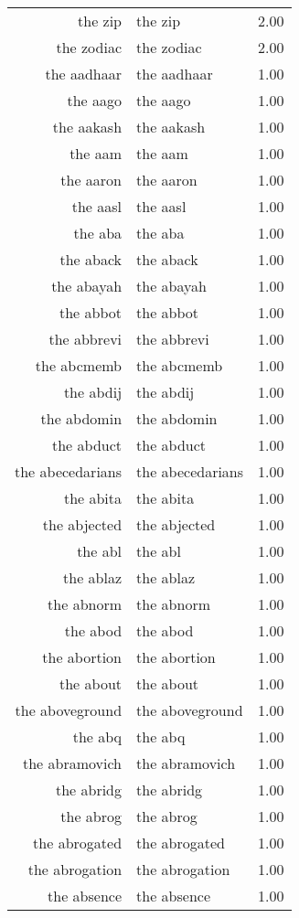 \begin{table}[ht]
\begin{tabular}{rlr}
  the zip & the zip & 2.00 \\ 
  the zodiac & the zodiac & 2.00 \\ 
  the aadhaar & the aadhaar & 1.00 \\ 
  the aago & the aago & 1.00 \\ 
  the aakash & the aakash & 1.00 \\ 
  the aam & the aam & 1.00 \\ 
  the aaron & the aaron & 1.00 \\ 
  the aasl & the aasl & 1.00 \\ 
  the aba & the aba & 1.00 \\ 
  the aback & the aback & 1.00 \\ 
  the abayah & the abayah & 1.00 \\ 
  the abbot & the abbot & 1.00 \\ 
  the abbrevi & the abbrevi & 1.00 \\ 
  the abcmemb & the abcmemb & 1.00 \\ 
  the abdij & the abdij & 1.00 \\ 
  the abdomin & the abdomin & 1.00 \\ 
  the abduct & the abduct & 1.00 \\ 
  the abecedarians & the abecedarians & 1.00 \\ 
  the abita & the abita & 1.00 \\ 
  the abjected & the abjected & 1.00 \\ 
  the abl & the abl & 1.00 \\ 
  the ablaz & the ablaz & 1.00 \\ 
  the abnorm & the abnorm & 1.00 \\ 
  the abod & the abod & 1.00 \\ 
  the abortion & the abortion & 1.00 \\ 
  the about & the about & 1.00 \\ 
  the aboveground & the aboveground & 1.00 \\ 
  the abq & the abq & 1.00 \\ 
  the abramovich & the abramovich & 1.00 \\ 
  the abridg & the abridg & 1.00 \\ 
  the abrog & the abrog & 1.00 \\ 
  the abrogated & the abrogated & 1.00 \\ 
  the abrogation & the abrogation & 1.00 \\ 
  the absence & the absence & 1.00 \\ 

\end{tabular}
\end{table}
